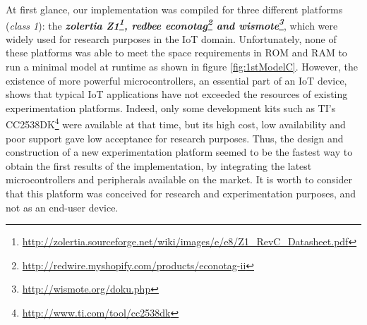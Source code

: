 At first glance, our implementation was compiled for three different platforms (\textit{class 1}): the \textit{\textbf{zolertia Z1\footnote{\url{http://zolertia.sourceforge.net/wiki/images/e/e8/Z1_RevC_Datasheet.pdf}}, redbee econotag\footnote{\url{http://redwire.myshopify.com/products/econotag-ii}} and wismote\footnote{\url{http://wismote.org/doku.php}}}}, which were widely used for research purposes in the IoT domain.
Unfortunately, none of these platforms was able to meet the space requirements in ROM and RAM to run a minimal model at runtime as shown in figure \ref{fig:1stModelC}.
However, the existence of more powerful microcontrollers, an essential part of an IoT device, shows that typical IoT applications have not exceeded the resources of existing experimentation platforms.
Indeed, only some development kits such as TI's CC2538DK\footnote{\url{http://www.ti.com/tool/cc2538dk}} were available at that time, but its high cost, low availability and poor support gave low acceptance for research purposes.
Thus, the design and construction of a new experimentation platform seemed to be the fastest way to obtain the first results of the implementation, by integrating the latest microcontrollers and peripherals available on the market.
It is worth to consider that this platform was conceived for research and experimentation purposes, and not as an end-user device.

